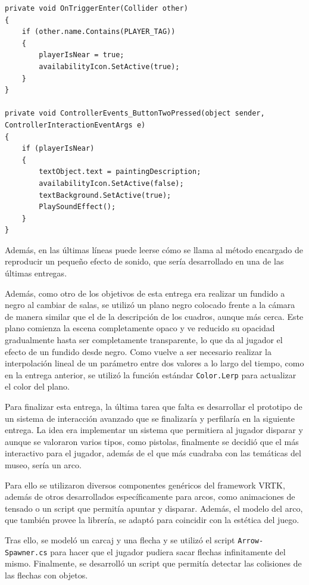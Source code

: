 \begin{lstlisting}[caption=Fragmento del script activar la descripción de los cuadros, label=lst:painting-description]
private void OnTriggerEnter(Collider other)
{
    if (other.name.Contains(PLAYER_TAG))
    {
        playerIsNear = true;
        availabilityIcon.SetActive(true);
    }
}
    
private void ControllerEvents_ButtonTwoPressed(object sender, ControllerInteractionEventArgs e)
{
    if (playerIsNear)
    {
        textObject.text = paintingDescription;
        availabilityIcon.SetActive(false);
        textBackground.SetActive(true);
        PlaySoundEffect();
    }
}
\end{lstlisting}

Además, en las últimas líneas puede leerse cómo se llama al método encargado de reproducir un pequeño efecto de sonido, que sería desarrollado en una de las últimas entregas.

Además, como otro de los objetivos de esta entrega era realizar un fundido a negro al cambiar de salas, se utilizó un plano negro colocado frente a la cámara de manera similar que el de la descripción de los cuadros, aunque más cerca. Este plano comienza la escena completamente opaco y ve reducido su opacidad gradualmente hasta ser completamente transparente, lo que da al jugador el efecto de un fundido desde negro. Como vuelve a ser necesario realizar la interpolación lineal de un parámetro entre dos valores a lo largo del tiempo, como en la entrega anterior, se utilizó la función estándar \texttt{Color.Lerp} para actualizar el color del plano.

Para finalizar esta entrega, la última tarea que falta es desarrollar el prototipo de un sistema de interacción avanzado que se finalizaría y perfilaría en la siguiente entrega. La idea era implementar un sistema que permitiera al jugador disparar y aunque se valoraron varios tipos, como pistolas, finalmente se decidió que el más interactivo para el jugador, además de el que más cuadraba con las temáticas del museo, sería un arco.

Para ello se utilizaron diversos componentes genéricos del framework \acs{VRTK}, además de otros desarrollados específicamente para arcos, como animaciones de tensado o un script que permitía apuntar y disparar. Además, el modelo del arco, que también provee la librería, se adaptó para coincidir con la estética del juego.

Tras ello, se modeló un carcaj y una flecha y se utilizó el script \texttt{Arrow-} \texttt{Spawner.cs} para hacer que el jugador pudiera sacar flechas infinitamente del mismo. Finalmente, se desarrolló un script que permitía detectar las colisiones de las flechas con objetos.

